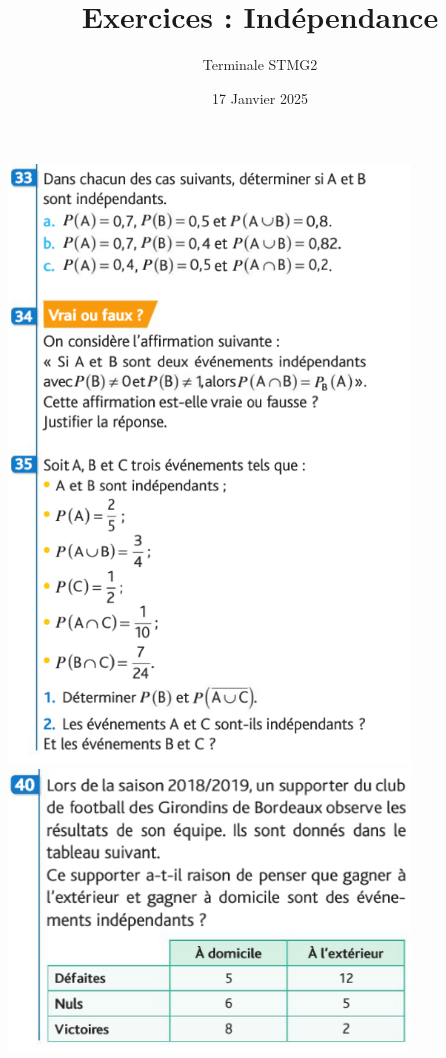 \documentclass{article}
\title{Exercices : Indépendance}
\date{17 Janvier 2025}
\author{Terminale STMG2}
\begin{document}
\maketitle

\begin{center}
\includegraphics[width=0.8\textwidth]{Exercice_1.png}
\includegraphics[width=0.8\textwidth]{Exercice_2.png}

\end{center}
\end{document}
